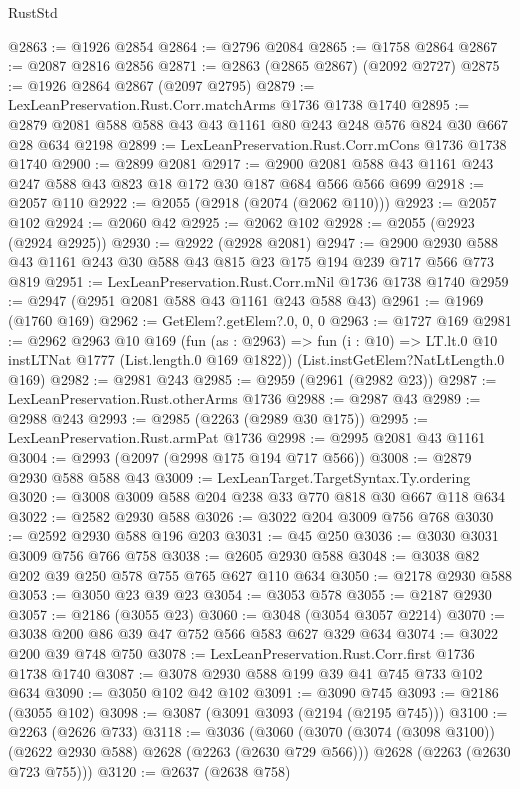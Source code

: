 \begin{lexlean}{RustStd}
\begin{coremodule}
{\begin{coremodule}
{{{{{{{{{{{{{{{@2863 := @1926 @2854
@2864 := @2796 @2084
@2865 := @1758 @2864
@2867 := @2087 @2816 @2856
@2871 := @2863 (@2865 @2867) (@2092 @2727)
@2875 := @1926 @2864 @2867 (@2097 @2795)
@2879 := LexLeanPreservation.Rust.Corr.matchArms @1736 @1738 @1740
@2895 := @2879 @2081 @588 @588 @43 @43 @1161 @80 @243 @248 @576 @824 @30 @667 @28 @634 @2198
@2899 := LexLeanPreservation.Rust.Corr.mCons @1736 @1738 @1740
@2900 := @2899 @2081
@2917 := @2900 @2081 @588 @43 @1161 @243 @247 @588 @43 @823 @18 @172 @30 @187 @684 @566 @566 @699
@2918 := @2057 @110
@2922 := @2055 (@2918 (@2074 (@2062 @110)))
@2923 := @2057 @102
@2924 := @2060 @42
@2925 := @2062 @102
@2928 := @2055 (@2923 (@2924 @2925))
@2930 := @2922 (@2928 @2081)
@2947 := @2900 @2930 @588 @43 @1161 @243 @30 @588 @43 @815 @23 @175 @194 @239 @717 @566 @773 @819
@2951 := LexLeanPreservation.Rust.Corr.mNil @1736 @1738 @1740
@2959 := @2947 (@2951 @2081 @588 @43 @1161 @243 @588 @43)
@2961 := @1969 (@1760 @169)
@2962 := GetElem?.getElem?.{0, 0, 0}
@2963 := @1727 @169
@2981 := @2962
    @2963
    @10
    @169
    (fun (as : @2963) =>
    fun (i : @10) => LT.lt.{0} @10 instLTNat @1777 (List.length.{0} @169 @1822))
    (List.instGetElem?NatLtLength.{0} @169)
@2982 := @2981 @243
@2985 := @2959 (@2961 (@2982 @23))
@2987 := LexLeanPreservation.Rust.otherArms @1736
@2988 := @2987 @43
@2989 := @2988 @243
@2993 := @2985 (@2263 (@2989 @30 @175))
@2995 := LexLeanPreservation.Rust.armPat @1736
@2998 := @2995 @2081 @43 @1161
@3004 := @2993 (@2097 (@2998 @175 @194 @717 @566))
@3008 := @2879 @2930 @588 @588 @43
@3009 := LexLeanTarget.TargetSyntax.Ty.ordering
@3020 := @3008 @3009 @588 @204 @238 @33 @770 @818 @30 @667 @118 @634
@3022 := @2582 @2930 @588
@3026 := @3022 @204 @3009 @756 @768
@3030 := @2592 @2930 @588 @196 @203
@3031 := @45 @250
@3036 := @3030 @3031 @3009 @756 @766 @758
@3038 := @2605 @2930 @588
@3048 := @3038 @82 @202 @39 @250 @578 @755 @765 @627 @110 @634
@3050 := @2178 @2930 @588
@3053 := @3050 @23 @39 @23
@3054 := @3053 @578
@3055 := @2187 @2930
@3057 := @2186 (@3055 @23)
@3060 := @3048 (@3054 @3057 @2214)
@3070 := @3038 @200 @86 @39 @47 @752 @566 @583 @627 @329 @634
@3074 := @3022 @200 @39 @748 @750
@3078 := LexLeanPreservation.Rust.Corr.first @1736 @1738 @1740
@3087 := @3078 @2930 @588 @199 @39 @41 @745 @733 @102 @634
@3090 := @3050 @102 @42 @102
@3091 := @3090 @745
@3093 := @2186 (@3055 @102)
@3098 := @3087 (@3091 @3093 (@2194 (@2195 @745)))
@3100 := @2263 (@2626 @733)
@3118 := @3036
    (@3060
      (@3070 (@3074 (@3098 @3100)) (@2622 @2930 @588) @2628 (@2263 (@2630 @729 @566)))
      @2628
      (@2263 (@2630 @723 @755)))
@3120 := @2637 (@2638 @758)
}}}}}}}}}}}}}}}
\end{coremodule}}
\end{coremodule}
\end{lexlean}

